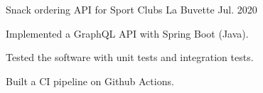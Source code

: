 

\begin{cventries}

  \cventry
    {Snack ordering API for Sport Clubs} %
    {La Buvette} %
    {} %
    {Jul. 2020} %
    {
      \begin{cvitems} %
        \item {Implemented a GraphQL API with Spring Boot (Java).}
        \item {Tested the software with unit tests and integration tests.}
        \item {Built a CI pipeline on Github Actions.}
      \end{cvitems}
    }

\end{cventries}
